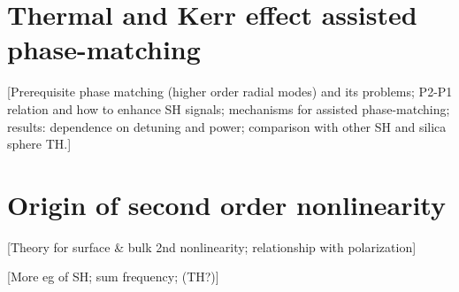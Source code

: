 \documentclass[a4paper,12pt,hyperref]{article}
\begin{document}
\section{Thermal and Kerr effect assisted phase-matching}
[Prerequisite phase matching (higher order radial modes) and its problems; P2-P1 relation and how to enhance SH signals; mechanisms for assisted phase-matching; results: dependence on detuning and power; comparison with other SH and silica sphere TH.]

\section{Origin of second order nonlinearity}
[Theory for surface \& bulk 2nd nonlinearity; relationship with polarization]

[More eg of SH; sum frequency; (TH?)]






\end{document}
